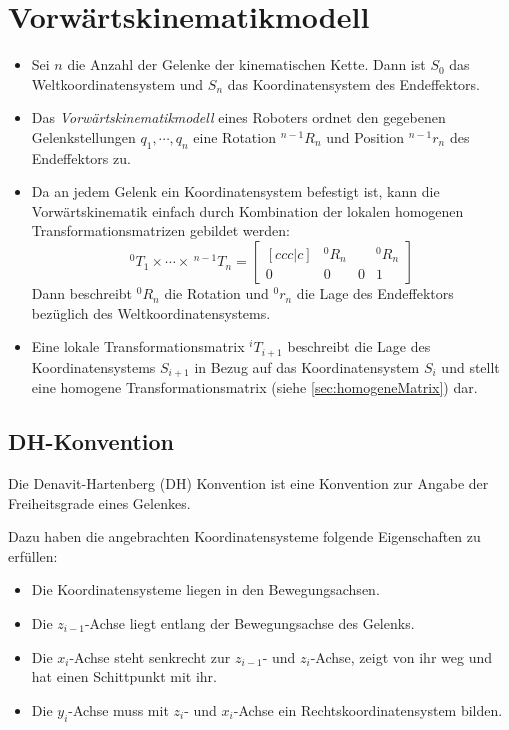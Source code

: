 	\section{Vorwärtskinematikmodell} %
		\label{sec:kinematik}

		\begin{itemize}
			\item Sei \( n \) die Anzahl der Gelenke der kinematischen Kette. Dann ist \( S _ 0 \) das Weltkoordinatensystem und \( S _ n \) das Koordinatensystem des Endeffektors.
			\item Das \textit{Vorwärtskinematikmodell} eines Roboters ordnet den gegebenen Gelenkstellungen \( q _ 1, \cdots, q _ n \) eine Rotation \( ^{n-1}R_n \) und Position \( ^{n-1}r_n \) des Endeffektors zu.
			\item Da an jedem Gelenk ein Koordinatensystem befestigt ist, kann die Vorwärtskinematik einfach durch Kombination der lokalen homogenen Transformationsmatrizen gebildet werden:
				\begin{equation*}
					^0T_1 \times \cdots \times \,^{n-1}T_n =
					\begin{bmatrix}[ccc|c]
						  & ^0R_n &   & ^0R_n \\ \hline
						0 & 0     & 0 & 1
					\end{bmatrix}
				\end{equation*}
				Dann beschreibt \( ^0R_n \) die Rotation und \( ^0r_n \) die Lage des Endeffektors bezüglich des Weltkoordinatensystems.
			\item Eine lokale Transformationsmatrix \( ^iT_{i+1} \) beschreibt die Lage des Koordinatensystems \( S _ { i + 1 } \) in Bezug auf das Koordinatensystem \( S _ i \) und stellt eine homogene Transformationsmatrix (siehe \ref{sec:homogeneMatrix}) dar.
		\end{itemize}

		\subsection{DH-Konvention} %
			Die Denavit-Hartenberg (DH) Konvention ist eine Konvention zur Angabe der Freiheitsgrade eines Gelenkes.

			Dazu haben die angebrachten Koordinatensysteme folgende Eigenschaften zu erfüllen:
			\begin{itemize}
				\item Die Koordinatensysteme liegen in den Bewegungsachsen.
				\item Die \( z _ { i - 1 } \)-Achse liegt entlang der Bewegungsachse des Gelenks.
				\item Die \( x _ i \)-Achse steht senkrecht zur \( z _ { i - 1 } \)- und \( z _ i \)-Achse, zeigt von ihr weg und hat einen Schittpunkt mit ihr.
				\item Die \( y _ i \)-Achse muss mit \( z _ i \)- und \( x _ i \)-Achse ein Rechtskoordinatensystem bilden.
			\end{itemize}

